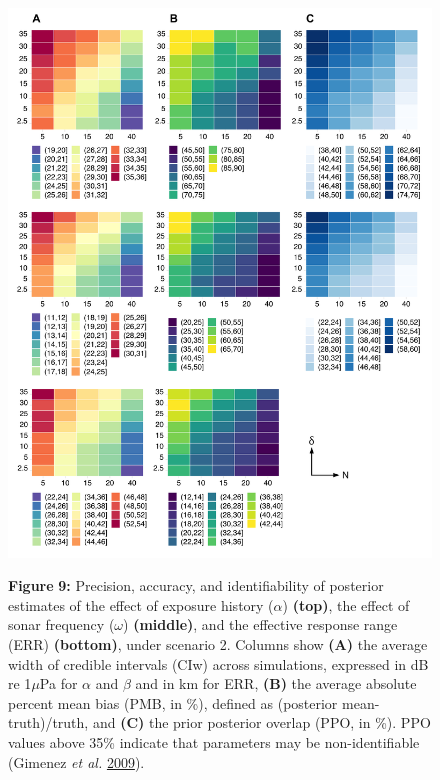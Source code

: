 \documentclass[
]{article}
\begin{document}
\begin{figure}

{\centering \includegraphics[width=0.9\linewidth]{fig/fig_heatplot_S2} 

}

\textbf{Figure }{\textbf{9:} \hypertarget{fig9}{}Precision, accuracy, and identifiability of posterior estimates of the effect of exposure history (\(\alpha\)) \textbf{(top)}, the effect of sonar frequency (\(\omega\)) \textbf{(middle)}, and the effective response range (ERR) \textbf{(bottom)}, under scenario 2. Columns show \textbf{(A)} the average width of credible intervals (CIw) across simulations, expressed in dB re 1\(\mu\)Pa for \(\alpha\) and \(\beta\) and in km for ERR, \textbf{(B)} the average absolute percent mean bias (PMB, in \%), defined as (posterior mean-truth)/truth, and \textbf{(C)} the prior posterior overlap (PPO, in \%). PPO values above 35\% indicate that parameters may be non-identifiable (Gimenez \emph{et al.} \protect\hyperlink{ref-Gimenez2009}{2009}).}\label{fig:unnamed-chunk-8}
\end{figure}
\end{document}
